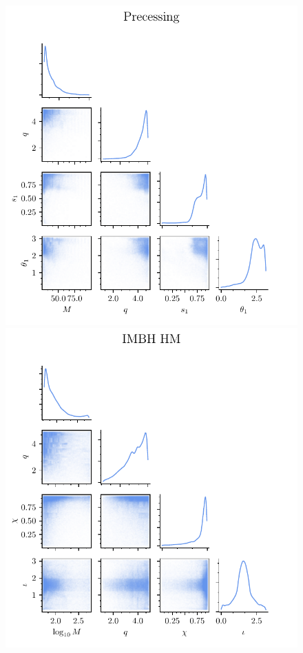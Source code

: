 \documentclass[twocolumn,showpacs,preprintnumbers,nofootinbib,prd,
superscriptaddress,10pt]{revtex4-2}
\begin{document}
\begin{figure}[t]
	\includegraphics[scale = 0.7]{bank_scatter_Precessing_flow}\hfill
	\includegraphics[scale = 0.7]{bank_scatter_IMBH_HM_flow}\hfill

\end{figure}
\end{document}
